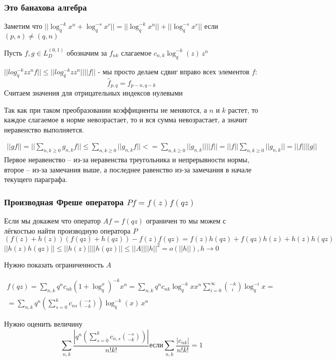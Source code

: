 \documentclass{article}
\begin{document}
	\subsubsection{Это банахова алгебра}
	Заметим что $ ||\log_q^{-k} x^n + \log_q^{-s} x^r|| =||\log_q^{-k} x^n ||+||\log_q^{-s} x^r|| $ если $(p,s) \neq (q,n) $
	
	Пусть $f,g \in L_D^{(0,1)}$
	обозначим за $f_{nk}$ слагаемое $c_{n,k} \log_q^{-k} (z) \, z^n$ 
	
	$||log_q^{-k} z z^n f||\leq ||log_q^{-k} z z^n|| ||f||  $ - мы просто делаем сдвиг вправо всех элементов $f$:
	\[\hat{f}_{p,q} = f_{p-n,q-k} \]
	Считаем значения для отрицательных индексов нулевыми
	
	Так как при таком преобразовании коэффициенты не меняются, а $n$ и $k$ растет, то каждое слагаемое в норме невозрастает, то и вся сумма невозрастает, а значит неравенство выполняется.
	
	\begin{multline}
		||g f|| = ||\sum_{n,k\geq 0} g_{n,k} f || \leq \sum_{n,k \geq 0} ||g_{n,k} f || <= \sum_{n,k\geq 0} ||g_{n,k}|| ||f || = ||f ||\sum_{n,k\geq 0} ||g_{n,k}||  = ||f|| ||g||
	\end{multline}
	Первое неравенство -- из-за неравенства треугольника и непрерывности нормы, второе -- из-за замечания выше, а последнее равенство из-за замечания в начале текущего параграфа.
	
	
	\subsubsection{Производная Фреше оператора $P f = f(z)f(qz) $}
	
	Если мы докажем что оператор $Af = f(qz)$ ограничен то мы можем с лёгкостью найти производную оператора $P$
	\[(f(z)+h(z))(f(qz)+h(qz)) - f(z)f(qz) = f(z)h(qz)+f(qz)h(z) + h(z)h(qz) \]
	$||h(z)h(qz)||\leq ||h(z)||||h(qz)|| \leq ||A||||h||^2 = o(||h||), h\to 0 $
	
	Нужно показать ограниченность $A$
	
	\begin{multline}
		f(qz) = \sum_{n,k}q^n c_{nk}(1+\log_q^x)^{-k}x^n = \sum_{n,k}q^n c_{nk} \log_q^{-k} x x^n \sum_{i=0}^\infty \binom{-k}{i} \log_q^{-i}x =\\
		= \sum_{n,k} q^n \left( \sum_{s=0}^k c_{ns}\binom{-s}{-k} \right) \log_q^{-k}(x)\, x^n
	\end{multline}
	
	Нужно оценить величину
	\[ \sum_{n,k} \frac{|q^n \left( \sum_{s=0}^k c_{n,s}\binom{-s}{-k} \right)|}{n!k!} \text{если} \sum_{n,k} \frac{|c_{nk}|}{n!k!} = 1 \]
	
\end{document}
